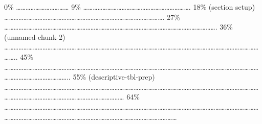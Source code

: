 \documentclass[
]{article}
\begin{document}
\textbar{} \textbar{} \textbar{} 0\% \textbar{}
\textbar\ldots\ldots\ldots\ldots\ldots\ldots\ldots\ldots\ldots\ldots\ldots{}
\textbar{} 9\% \textbar{}
\textbar\ldots\ldots\ldots\ldots\ldots\ldots\ldots\ldots\ldots\ldots\ldots\ldots\ldots\ldots\ldots\ldots\ldots\ldots\ldots\ldots\ldots\ldots.
\textbar{} 18\% (section setup) \textbar{}
\textbar\ldots\ldots\ldots\ldots\ldots\ldots\ldots\ldots\ldots\ldots\ldots\ldots\ldots\ldots\ldots\ldots\ldots\ldots\ldots\ldots\ldots\ldots\ldots\ldots\ldots\ldots\ldots\ldots\ldots\ldots\ldots\ldots\ldots.
\textbar{} 27\% \textbar{}
\textbar\ldots\ldots\ldots\ldots\ldots\ldots\ldots\ldots\ldots\ldots\ldots\ldots\ldots\ldots\ldots\ldots\ldots\ldots\ldots\ldots\ldots\ldots\ldots\ldots\ldots\ldots\ldots\ldots\ldots\ldots\ldots\ldots\ldots\ldots\ldots\ldots\ldots\ldots\ldots\ldots\ldots\ldots\ldots\ldots.
\textbar{} 36\% (unnamed-chunk-2) \textbar{}
\textbar\ldots\ldots\ldots\ldots\ldots\ldots\ldots\ldots\ldots\ldots\ldots\ldots\ldots\ldots\ldots\ldots\ldots\ldots\ldots\ldots\ldots\ldots\ldots\ldots\ldots\ldots\ldots\ldots\ldots\ldots\ldots\ldots\ldots\ldots\ldots\ldots\ldots\ldots\ldots\ldots\ldots\ldots\ldots\ldots\ldots\ldots\ldots\ldots\ldots\ldots\ldots\ldots\ldots\ldots\ldots..
\textbar{} 45\% \textbar{}
\textbar\ldots\ldots\ldots\ldots\ldots\ldots\ldots\ldots\ldots\ldots\ldots\ldots\ldots\ldots\ldots\ldots\ldots\ldots\ldots\ldots\ldots\ldots\ldots\ldots\ldots\ldots\ldots\ldots\ldots\ldots\ldots\ldots\ldots\ldots\ldots\ldots\ldots\ldots\ldots\ldots\ldots\ldots\ldots\ldots\ldots\ldots\ldots\ldots\ldots\ldots\ldots\ldots\ldots\ldots\ldots\ldots\ldots\ldots\ldots\ldots\ldots\ldots\ldots\ldots\ldots\ldots..
\textbar{} 55\% (descriptive-tbl-prep) \textbar{}
\textbar\ldots\ldots\ldots\ldots\ldots\ldots\ldots\ldots\ldots\ldots\ldots\ldots\ldots\ldots\ldots\ldots\ldots\ldots\ldots\ldots\ldots\ldots\ldots\ldots\ldots\ldots\ldots\ldots\ldots\ldots\ldots\ldots\ldots\ldots\ldots\ldots\ldots\ldots\ldots\ldots\ldots\ldots\ldots\ldots\ldots\ldots\ldots\ldots\ldots\ldots\ldots\ldots\ldots\ldots\ldots\ldots\ldots\ldots\ldots\ldots\ldots\ldots\ldots\ldots\ldots\ldots\ldots\ldots\ldots\ldots\ldots\ldots\ldots\ldots\ldots\ldots\ldots\ldots{}
\textbar{} 64\% \textbar{}
\textbar\ldots\ldots\ldots\ldots\ldots\ldots\ldots\ldots\ldots\ldots\ldots\ldots\ldots\ldots\ldots\ldots\ldots\ldots\ldots\ldots\ldots\ldots\ldots\ldots\ldots\ldots\ldots\ldots\ldots\ldots\ldots\ldots\ldots\ldots\ldots\ldots\ldots\ldots\ldots\ldots\ldots\ldots\ldots\ldots\ldots\ldots\ldots\ldots\ldots\ldots\ldots\ldots\ldots\ldots\ldots\ldots\ldots\ldots\ldots\ldots\ldots\ldots\ldots\ldots\ldots\ldots\ldots\ldots\ldots\ldots\ldots\ldots\ldots\ldots\ldots\ldots\ldots\ldots\ldots\ldots\ldots\ldots\ldots\ldots\ldots\ldots\ldots\ldots\ldots{}
\end{document}

